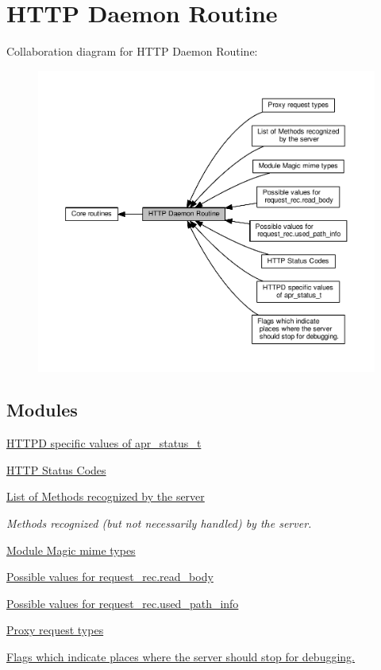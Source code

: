 \hypertarget{group__APACHE__CORE__DAEMON}{}\section{H\+T\+TP Daemon Routine}
\label{group__APACHE__CORE__DAEMON}
Collaboration diagram for H\+T\+TP Daemon Routine\+:
\nopagebreak
\begin{figure}[H]
\begin{center}
\leavevmode
\includegraphics[width=350pt]{group__APACHE__CORE__DAEMON}
\end{center}
\end{figure}
\subsection*{Modules}
\begin{DoxyCompactItemize}
\item 
\hyperlink{group__APACHE__APR__STATUS__T}{H\+T\+T\+P\+D specific values of apr\+\_\+status\+\_\+t}
\item 
\hyperlink{group__HTTP__Status}{H\+T\+T\+P Status Codes}
\item 
\hyperlink{group__Methods}{List of Methods recognized by the server}
\begin{DoxyCompactList}\small\item\em Methods recognized (but not necessarily handled) by the server. \end{DoxyCompactList}\item 
\hyperlink{group__module__magic}{Module Magic mime types}
\item 
\hyperlink{group__values__request__rec__body}{Possible values for request\+\_\+rec.\+read\+\_\+body}
\item 
\hyperlink{group__values__request__rec__used__path__info}{Possible values for request\+\_\+rec.\+used\+\_\+path\+\_\+info}
\item 
\hyperlink{group__ProxyReq}{Proxy request types}
\item 
\hyperlink{group__stopsignal}{Flags which indicate places where the server should stop for debugging.}
\end{DoxyCompactItemize}
